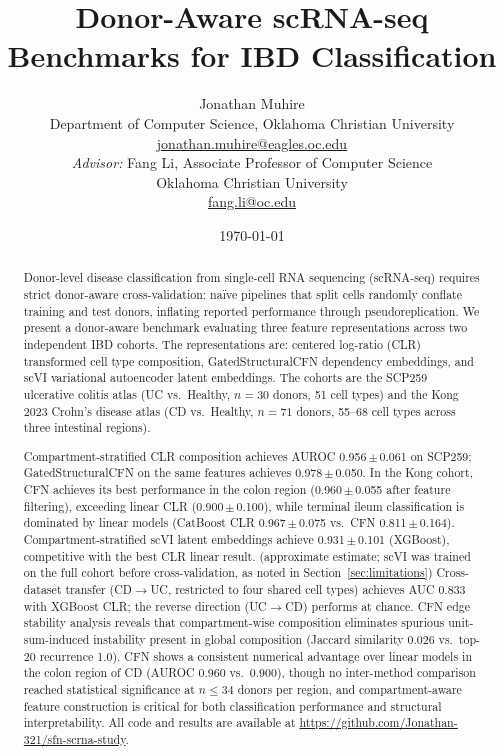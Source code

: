 \documentclass[11pt,letterpaper]{article}
\title{\textbf{Donor-Aware scRNA-seq Benchmarks for IBD Classification}}
\author{
  Jonathan Muhire\\
  \small Department of Computer Science, Oklahoma Christian University\\
  \small \href{mailto:jonathan.muhire@eagles.oc.edu}{jonathan.muhire@eagles.oc.edu}\\[6pt]
  \small \textit{Advisor:} Fang Li, Associate Professor of Computer Science\\
  \small Oklahoma Christian University\\
  \small \href{mailto:fang.li@oc.edu}{fang.li@oc.edu}
}
\date{\today}
\begin{document}
\maketitle

\begin{abstract}
Donor-level disease classification from single-cell RNA sequencing (scRNA-seq)
requires strict donor-aware cross-validation: na\"ive pipelines that split cells
randomly conflate training and test donors, inflating reported performance through
pseudoreplication. We present a donor-aware benchmark evaluating three feature
representations across two independent IBD cohorts. The representations are:
centered log-ratio (CLR) transformed cell type composition, GatedStructuralCFN
dependency embeddings, and scVI variational autoencoder latent embeddings. The
cohorts are the SCP259 ulcerative colitis atlas (UC vs.\ Healthy, $n=30$ donors,
51 cell types) and the Kong 2023 Crohn's disease atlas (CD vs.\ Healthy, $n=71$
donors, 55--68 cell types across three intestinal regions).

Compartment-stratified CLR composition achieves AUROC 0.956\,$\pm$\,0.061 on
SCP259; GatedStructuralCFN on the same features achieves 0.978\,$\pm$\,0.050.
In the Kong cohort, CFN achieves its best performance in the colon region
(0.960\,$\pm$\,0.055 after feature filtering), exceeding linear CLR
(0.900\,$\pm$\,0.100), while terminal ileum classification is dominated by linear
models (CatBoost CLR 0.967\,$\pm$\,0.075 vs.\ CFN 0.811\,$\pm$\,0.164).
Compartment-stratified scVI latent embeddings achieve 0.931\,$\pm$\,0.101
(XGBoost), competitive with the best CLR linear result.
(approximate estimate; scVI was trained on the full cohort before cross-validation, as noted in Section~\ref{sec:limitations}) Cross-dataset transfer
(CD$\rightarrow$UC, restricted to four shared cell types) achieves AUC 0.833
with XGBoost CLR; the reverse direction (UC$\rightarrow$CD) performs at chance.
CFN edge stability analysis reveals that compartment-wise composition eliminates
spurious unit-sum-induced instability present in global composition (Jaccard
similarity 0.026 vs.\ top-20 recurrence 1.0). CFN shows a consistent numerical advantage over linear models in the colon region of CD (AUROC 0.960 vs.\ 0.900), though no inter-method comparison reached statistical significance at $n \leq 34$ donors per region, and
compartment-aware feature construction is critical for both classification
performance and structural interpretability.
All code and results are available at
\url{https://github.com/Jonathan-321/sfn-scrna-study}.
\end{abstract}
\end{document}
